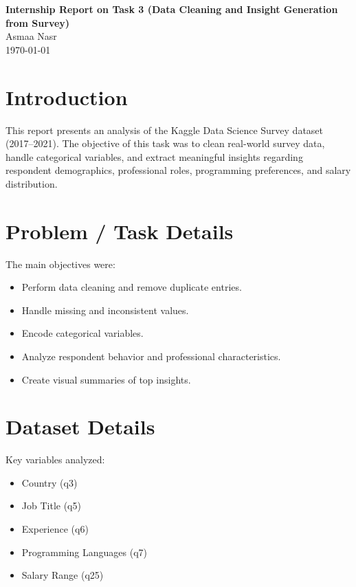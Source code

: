 \documentclass[a4paper,12pt]{report}
\begin{document}
\begin{center}
    \Huge \textbf{Internship Report on Task 3 (Data Cleaning and Insight Generation from Survey)} \\
    \vspace{0.5cm}
    \Large Asmaa Nasr \\
    \vspace{0.5cm}
    \Large \today
\end{center}

\section{Introduction}

This report presents an analysis of the Kaggle Data Science Survey dataset (2017–2021)\cite{b1}. 
The objective of this task was to clean real-world survey data, handle categorical variables, and extract meaningful insights regarding respondent demographics, professional roles, programming preferences, and salary distribution.

\section{Problem / Task Details}

The main objectives were:

\begin{itemize}
    \item Perform data cleaning and remove duplicate entries.
    \item Handle missing and inconsistent values.
    \item Encode categorical variables.
    \item Analyze respondent behavior and professional characteristics.
    \item Create visual summaries of top insights.
\end{itemize}

\section{Dataset Details}

Key variables analyzed:

\begin{itemize}
    \item Country (q3)
    \item Job Title (q5)
    \item Experience (q6)
    \item Programming Languages (q7)
    \item Salary Range (q25)
\end{itemize}
\end{document}
